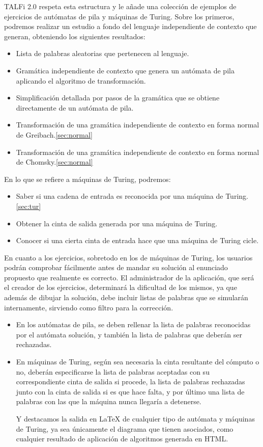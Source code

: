 \documentclass[12pt,a4paper,spanish]{book}
\begin{document}
TALFi 2.0 respeta esta estructura y le a\~nade una colecci\'on de ejemplos de ejercicios de aut\'omatas de pila y m\'aquinas de Turing. Sobre los primeros, podremos realizar un estudio a fondo del lenguaje independiente de contexto que generan, obteniendo los siguientes resultados:
\begin{itemize}
\item Lista de palabras aleatorias que pertenecen al lenguaje.
\item Gram\'atica independiente de contexto que genera un aut\'omata de pila aplicando el algoritmo de transformaci\'on.
\item Simplificaci\'on detallada por pasos de la gram\'atica que se obtiene directamente de un aut\'omata de pila.
\item Transformaci\'on de una gram\'atica independiente de contexto en forma normal de Greibach.\ref{sec:normal}
\item Transformaci\'on de una gram\'atica independiente de contexto en forma normal de Chomsky.\ref{sec:normal}\\
\end{itemize}

En lo que se refiere a m\'aquinas de Turing, podremos:
\begin{itemize}
\item Saber si una cadena de entrada es reconocida por una m\'aquina de Turing. \ref{sec:tur}
\item Obtener la cinta de salida generada por una m\'aquina de Turing.
\item Conocer si una cierta cinta de entrada hace que una m\'aquina de Turing cicle.
\end{itemize}

En cuanto a los ejercicios, sobretodo en los de m\'aquinas de Turing, los usuarios podr\'an comprobar f\'acilmente antes de mandar su soluci\'on al enunciado propuesto que realmente es correcto.
El administrador de la aplicaci\'on, que ser\'a el creador de los ejercicios, determinar\'a la dificultad de los mismos, ya que adem\'as de dibujar la soluci\'on, debe incluir listas de palabras que se simular\'an internamente, sirviendo como filtro para la correcci\'on.
\begin{itemize}
\item En los aut\'omatas de pila, se deben rellenar la lista de palabras reconocidas por el aut\'omata soluci\'on, y tambi\'en la lista de palabras que deber\'an ser rechazadas.
\item En m\'aquinas de Turing, seg\'un sea necesaria la cinta resultante del c\'omputo o no, deber\'an especificarse la lista de palabras aceptadas con su correspondiente cinta de salida si procede, la lista de palabras rechazadas junto con la cinta de salida si es que hace falta, y por \'ultimo una lista de palabras con las que la m\'aquina nunca llegar\'ia a detenerse.

Y destacamos la salida en \LaTeX{} de cualquier tipo de aut\'omata y m\'aquinas de Turing, ya sea \'unicamente el diagrama que tienen asociados, como cualquier resultado de aplicaci\'on de algoritmos generada en HTML. 
\end{itemize}
\end{document}
